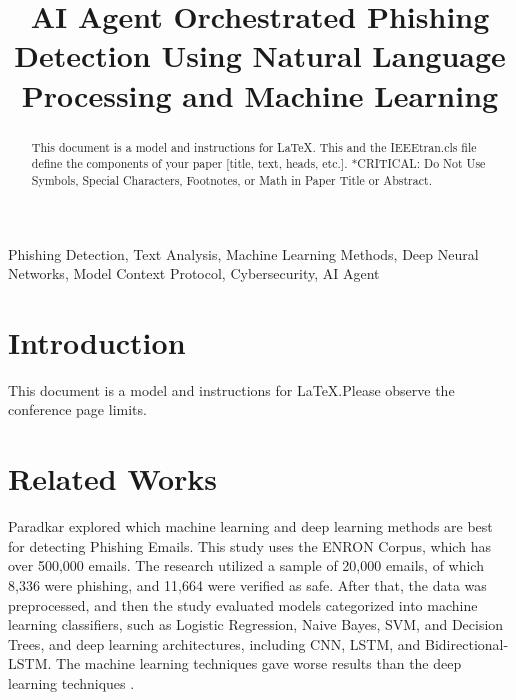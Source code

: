 \documentclass[conference]{IEEEtran}
\begin{document}
\title{
AI Agent Orchestrated Phishing Detection Using Natural Language Processing and Machine Learning\\
}

\author{

\and

}

\maketitle



\begin{abstract}
This document is a model and instructions for \LaTeX.
This and the IEEEtran.cls file define the components of your paper [title, text, heads, etc.]. *CRITICAL: Do Not Use Symbols, Special Characters, Footnotes,
or Math in Paper Title or Abstract.
\end{abstract}

\begin{IEEEkeywords}

Phishing Detection, Text Analysis, Machine Learning Methods, Deep Neural Networks, Model Context Protocol, Cybersecurity, AI Agent

\end{IEEEkeywords}

\section{Introduction}
This document is a model and instructions for \LaTeX.Please observe the conference page limits.

\section{Related Works}

Paradkar explored which machine learning and deep learning methods are best for detecting Phishing Emails. This study uses the ENRON Corpus, which has over 500,000 emails. The research utilized a sample of 20,000 emails, of which 8,336 were phishing, and 11,664 were verified as safe. After that, the data was preprocessed, and then the study evaluated models categorized into machine learning classifiers, such as Logistic Regression, Naive Bayes, SVM, and Decision Trees, and deep learning architectures, including CNN, LSTM, and Bidirectional-LSTM. The machine learning techniques gave worse results than the deep learning techniques \cite{paradkar2023phishing}.
\end{document}
